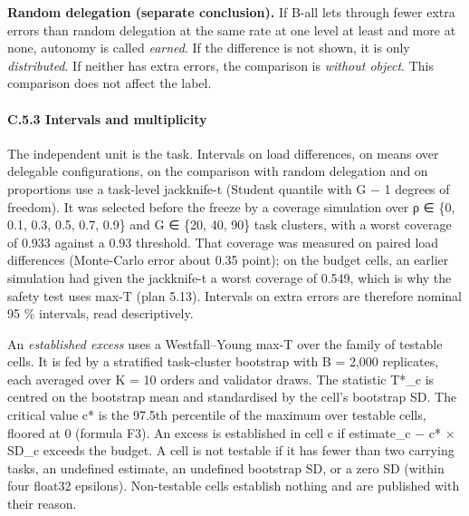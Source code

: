 \textbf{Random delegation (separate conclusion).} If B-all lets through fewer extra errors than random delegation at the same rate at one level at least and more at none, autonomy is called \emph{earned}. If the difference is not shown, it is only \emph{distributed}. If neither has extra errors, the comparison is \emph{without object}. This comparison does not affect the label.

\paragraph{C.5.3 Intervals and multiplicity}\label{c.5.3-intervals-and-multiplicity}

The independent unit is the task. Intervals on load differences, on means over delegable configurations, on the comparison with random delegation and on proportions use a task-level jackknife-t (Student quantile with G − 1 degrees of freedom). It was selected before the freeze by a coverage simulation over ρ ∈ \{0, 0.1, 0.3, 0.5, 0.7, 0.9\} and G ∈ \{20, 40, 90\} task clusters, with a worst coverage of 0.933 against a 0.93 threshold. That coverage was measured on paired load differences (Monte-Carlo error about 0.35 point); on the budget cells, an earlier simulation had given the jackknife-t a worst coverage of 0.549, which is why the safety test uses max-T (plan 5.13). Intervals on extra errors are therefore nominal 95 \% intervals, read descriptively.

An \emph{established excess} uses a Westfall--Young max-T over the family of testable cells. It is fed by a stratified task-cluster bootstrap with B = 2,000 replicates, each averaged over K = 10 orders and validator draws. The statistic T*\_c is centred on the bootstrap mean and standardised by the cell's bootstrap SD. The critical value c* is the 97.5th percentile of the maximum over testable cells, floored at 0 (formula F3). An excess is established in cell c if estimate\_c − c* × SD\_c exceeds the budget. A cell is not testable if it has fewer than two carrying tasks, an undefined estimate, an undefined bootstrap SD, or a zero SD (within four float32 epsilons). Non-testable cells establish nothing and are published with their reason.

